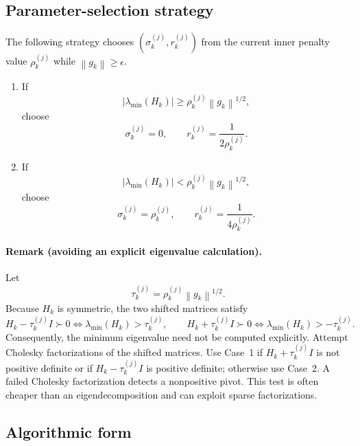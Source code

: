 \documentclass[11pt]{article}
\newcommand{\norm}[1]{\left\lVert #1\right\rVert}
\newcommand{\lammin}{\lambda_{\min}}
\begin{document}
\subsection{Parameter-selection strategy}

The following strategy chooses $(\sigma_k^{(j)},r_k^{(j)})$ from the current
inner penalty value $\rho_k^{(j)}$ while $\norm{g_k}\geq\epsilon$.

\begin{enumerate}[leftmargin=2.2em,label=\textbf{Case \arabic*.}]
    \item If
    \[
        \left|\lammin(H_k)\right|
        \geq \rho_k^{(j)}\norm{g_k}^{1/2},
    \]
    choose
    \[
        \sigma_k^{(j)}=0,\qquad
        r_k^{(j)}=\frac{1}{2\rho_k^{(j)}}.
    \]

    \item If
    \[
        \left|\lammin(H_k)\right|
        < \rho_k^{(j)}\norm{g_k}^{1/2},
    \]
    choose
    \[
        \sigma_k^{(j)}=\rho_k^{(j)},\qquad
        r_k^{(j)}=\frac{1}{4\rho_k^{(j)}}.
    \]
\end{enumerate}

\paragraph{Remark (avoiding an explicit eigenvalue calculation).}
Let
\[
    \tau_k^{(j)}=\rho_k^{(j)}\norm{g_k}^{1/2}.
\]
Because $H_k$ is symmetric, the two shifted matrices satisfy
\[
    H_k-\tau_k^{(j)}I\succ 0
    \iff \lammin(H_k)>\tau_k^{(j)},
    \qquad
    H_k+\tau_k^{(j)}I\succ 0
    \iff \lammin(H_k)>-\tau_k^{(j)}.
\]
Consequently, the minimum eigenvalue need not be computed explicitly.  Attempt
Cholesky factorizations of the shifted matrices.  Use Case~1 if
$H_k+\tau_k^{(j)}I$ is not positive definite or if
$H_k-\tau_k^{(j)}I$ is positive definite; otherwise use Case~2.  A failed
Cholesky factorization detects a nonpositive pivot.  This test is often cheaper
than an eigendecomposition and can exploit sparse factorizations.

\subsection{Algorithmic form}
\end{document}
